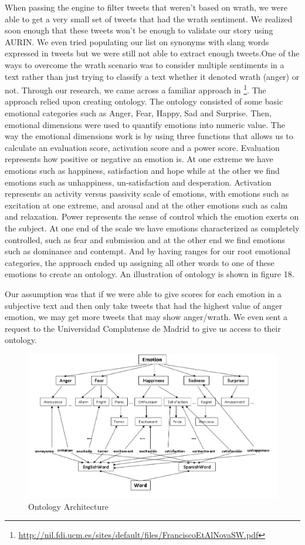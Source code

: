 When passing the engine to filter tweets that weren’t based on wrath, we were able to get a very small set of tweets that had the wrath sentiment. We realized soon enough that these tweets won’t be enough to validate our story using AURIN. We even tried populating our list on synonyms with slang words expressed in tweets but we were still not able to extract enough tweets.One of the ways to overcome the wrath scenario was to consider multiple sentiments in a text rather than just trying to classify a text whether it denoted wrath (anger) or not. Through our research, we came across a familiar approach in \footnote{\url{http://nil.fdi.ucm.es/sites/default/files/FranciscoEtAlNovaSW.pdf}}. The approach relied upon creating ontology. The ontology consisted of some basic emotional categories such as Anger, Fear, Happy, Sad and Surprise. Then, emotional dimensions were used to quantify emotions into numeric value. The way the emotional dimensions work is by using three functions that allows us to calculate an evaluation score, activation score and a power score. Evaluation represents how positive or negative an emotion is. At one extreme we have emotions such as happiness, satisfaction and hope while at the other we find emotions such as unhappiness, un-satisfaction and desperation. Activation represents an activity versus passivity scale of emotions, with emotions such as excitation at one extreme, and arousal and at the other emotions such as calm and relaxation. Power represents the sense of control which the emotion exerts on the subject. At one end of the scale we have emotions characterized as completely controlled, such as fear and submission and at the other end we find emotions such as dominance and contempt. And by having ranges for our root emotional categories, the approach ended up assigning all other words to one of these emotions to create an ontology. An illustration of ontology is shown in figure 18. 

Our assumption was that if we were able to give scores for each emotion in a subjective text and then only take tweets that had the highest value of anger emotion, we may get more tweets that may show anger/wrath. We even sent a request to the Universidad Complutense de Madrid to give us access to their ontology.



\begin{figure}[H]
    \centering
    \includegraphics[width=12cm,keepaspectratio=true]{images/deployment/Tree_OntoEmotion.png}
    \caption{Ontology Architecture}
    \label{fig:ontology architecture}
\end{figure}
 

